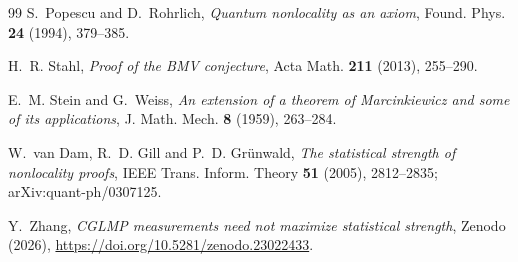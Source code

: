 \documentclass[11pt]{article}
\theoremstyle{remark}
\numberwithin{equation}{section}
\begin{document}
\begin{thebibliography}{99}
S.~Popescu and D.~Rohrlich, \emph{Quantum nonlocality as an axiom}, Found. Phys. \textbf{24} (1994), 379--385.

H.~R. Stahl, \emph{Proof of the BMV conjecture}, Acta Math. \textbf{211} (2013), 255--290.

E.~M. Stein and G.~Weiss, \emph{An extension of a theorem of Marcinkiewicz and some of its applications}, J. Math.
Mech. \textbf{8} (1959), 263--284.

W.~van Dam, R.~D. Gill and P.~D. Gr\"unwald, \emph{The statistical strength of nonlocality proofs}, IEEE Trans. Inform.
Theory \textbf{51} (2005), 2812--2835; arXiv:quant-ph/0307125.

Y.~Zhang, \emph{CGLMP measurements need not maximize statistical strength}, Zenodo (2026),
\url{https://doi.org/10.5281/zenodo.23022433}.

\end{thebibliography}
\end{document}
